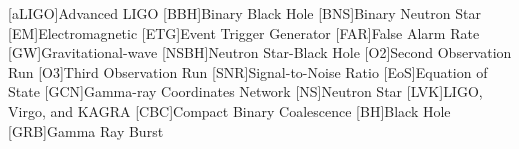 [aLIGO]{Advanced LIGO}
[BBH]{Binary Black Hole}
[BNS]{Binary Neutron Star}
[EM]{Electromagnetic}
[ETG]{Event Trigger Generator}
[FAR]{False Alarm Rate}
[GW]{Gravitational-wave}
[NSBH]{Neutron Star-Black Hole}
[O2]{Second Observation Run}
[O3]{Third Observation Run}
[SNR]{Signal-to-Noise Ratio}
[EoS]{Equation of State}
[GCN]{Gamma-ray Coordinates Network}
[NS]{Neutron Star}
[LVK]{LIGO, Virgo, and KAGRA}
[CBC]{Compact Binary Coalescence}
[BH]{Black Hole}
[GRB]{Gamma Ray Burst}


\newcommand{\comment}[1]{{\color{red} #1}}

